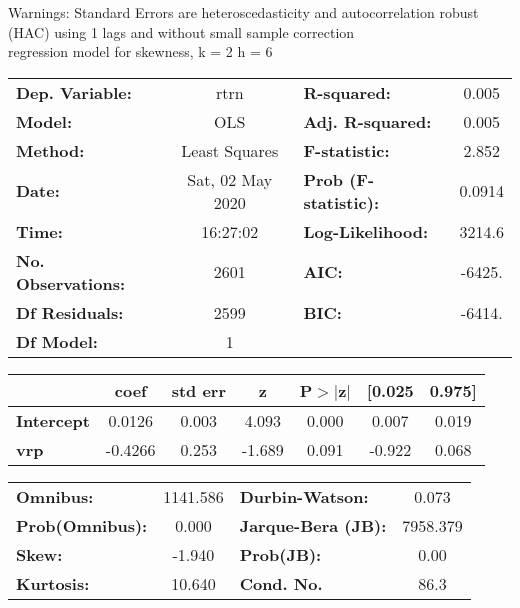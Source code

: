 Warnings: \newline
 [1] Standard Errors are heteroscedasticity and autocorrelation robust (HAC) using 1 lags and without small sample correction\\ 

regression model for skewness, k = 2 h = 6\begin{center}
\begin{tabular}{lclc}
\toprule
\textbf{Dep. Variable:}    &       rtrn       & \textbf{  R-squared:         } &     0.005   \\
\textbf{Model:}            &       OLS        & \textbf{  Adj. R-squared:    } &     0.005   \\
\textbf{Method:}           &  Least Squares   & \textbf{  F-statistic:       } &     2.852   \\
\textbf{Date:}             & Sat, 02 May 2020 & \textbf{  Prob (F-statistic):} &   0.0914    \\
\textbf{Time:}             &     16:27:02     & \textbf{  Log-Likelihood:    } &    3214.6   \\
\textbf{No. Observations:} &        2601      & \textbf{  AIC:               } &    -6425.   \\
\textbf{Df Residuals:}     &        2599      & \textbf{  BIC:               } &    -6414.   \\
\textbf{Df Model:}         &           1      & \textbf{                     } &             \\
\bottomrule
\end{tabular}
\begin{tabular}{lcccccc}
                   & \textbf{coef} & \textbf{std err} & \textbf{z} & \textbf{P$> |$z$|$} & \textbf{[0.025} & \textbf{0.975]}  \\
\midrule
\textbf{Intercept} &       0.0126  &        0.003     &     4.093  &         0.000        &        0.007    &        0.019     \\
\textbf{vrp}       &      -0.4266  &        0.253     &    -1.689  &         0.091        &       -0.922    &        0.068     \\
\bottomrule
\end{tabular}
\begin{tabular}{lclc}
\textbf{Omnibus:}       & 1141.586 & \textbf{  Durbin-Watson:     } &    0.073  \\
\textbf{Prob(Omnibus):} &   0.000  & \textbf{  Jarque-Bera (JB):  } & 7958.379  \\
\textbf{Skew:}          &  -1.940  & \textbf{  Prob(JB):          } &     0.00  \\
\textbf{Kurtosis:}      &  10.640  & \textbf{  Cond. No.          } &     86.3  \\
\bottomrule
\end{tabular}
\end{center}

